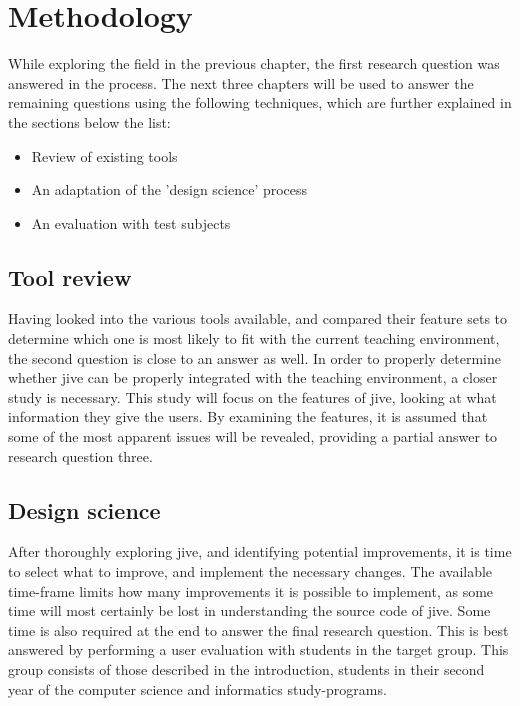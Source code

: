\chapter{Methodology}\label{methodology}

While exploring the field in the previous chapter, the first research question was answered in the process.
The next three chapters will be used to answer the remaining questions using the following techniques, which are further explained in the sections below the list:

\begin{itemize}
	\item{Review of existing tools}
	\item{An adaptation of the 'design science' process}%
	\item{An evaluation with test subjects}
\end{itemize}

\section{Tool review}\label{methReview}

Having looked into the various tools available, and compared their feature sets to determine which one is most likely to fit with the current teaching environment, the second question is close to an answer as well.
In order to properly determine whether \gls{jive} can be properly integrated with the teaching environment, a closer study is necessary.
This study will focus on the features of \gls{jive}, looking at what information they give the users.
By examining the features, it is assumed that some of the most apparent issues will be revealed, providing a partial answer to research question three.

\section{Design science}\label{methDesign}

After thoroughly exploring \gls{jive}, and identifying potential improvements, it is time to select what to improve, and implement the necessary changes.
The available time-frame limits how many improvements it is possible to implement, as some time will most certainly be lost in understanding the source code of \gls{jive}.
Some time is also required at the end to answer the final research question.
This is best answered by performing a user evaluation with students in the target group.
This group consists of those described in the introduction, students in their second year of the computer science and informatics study-programs.

